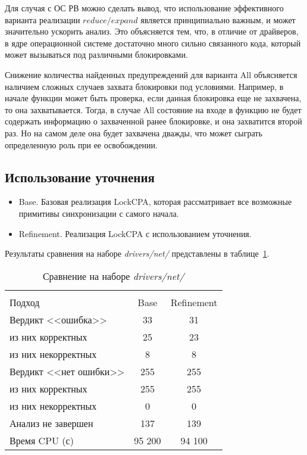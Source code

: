 Для случая с ОС РВ можно сделать вывод, что использование эффективного варианта реализации $reduce/expand$ является принципиально важным, и может значительно ускорить анализ.
Это объясняется тем, что, в отличие от драйверов, в ядре операционной системе достаточно много сильно связанного кода, который может вызываться под различными блокировками.

Снижение количества найденных предупреждений для варианта All объясняется наличием сложных случаев захвата блокировки под условиями.
Например, в начале функции может быть проверка, если данная блокировка еще не захвачена, то она захватывается. 
Тогда, в случае All состояние на входе в функцию не будет содержать информацию о захваченной ранее блокировке, и она захватится второй раз.
Но на самом деле она будет захвачена дважды, что может сыграть определенную роль при ее освобождении. 

\subsection{Использование уточнения}

\begin{itemize}
\item Base. Базовая реализация LockCPA, которая рассматривает все возможные примитивы синхронизации с самого начала.
\item Refinement. Реализация LockCPA с использованием уточнения.
\end{itemize}

Результаты сравнения на наборе \textit{drivers/net/} представлены в таблице~\ref{table-drivers-lock-refinement}.

  \begin{table}[h]\footnotesize \centering
    \caption{Сравнение на наборе \textit{drivers/net/}}
  	\label{table-drivers-lock-refinement}
    \begin{tabular}{ | l | c | c | }
      \hline 
      		& 		\multicolumn{2}{c|}{\combatmode}  \\
      Подход         				& Base   	& Refinement \\ \hline
      Вердикт <<ошибка>> 			& 33    	& 31       \\ 
  \hspace{0.5cm} из них корректных 	& 25 		& 23 		\\ 
  \hspace{0.5cm} из них некорректных & 8 		& 8 		\\ \hline
      Вердикт <<нет ошибки>>  		& 255      	& 255       	\\ 
  \hspace{0.5cm} из них корректных 	& 255 		& 255    	\\
  \hspace{0.5cm} из них некорректных & 0 		& 0    		\\ \hline
      Анализ не завершен       		& 137     	& 139        \\ \hline
      Время CPU (с)   				& 95 200 	& 94 100    \\ 
      \hline
    \end{tabular}
  \end{table}

